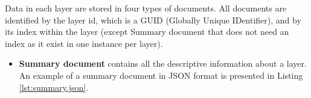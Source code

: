 Data in each layer are stored in four types of documents. All documents are identified by the layer id, which is a GUID (Globally Unique IDentifier), and by its index within the layer (except Summary document that does not need an index as it exist in one instance per layer).
\begin{itemize}

    \item \textbf{Summary document} contains all the descriptive information about a layer. An example of a summary document in JSON format is presented in Listing \ref{lst:summary.json}.
    


    


\end{itemize}
